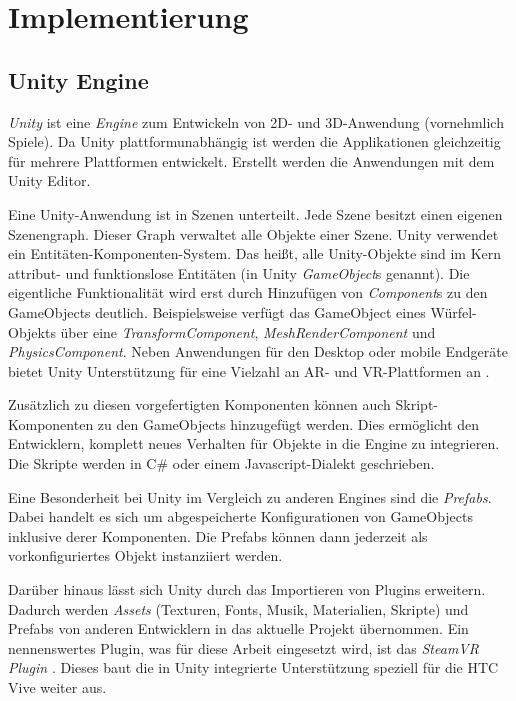 \chapter{Implementierung}
\label{chap:implementation}

\section{Unity Engine}
\emph{Unity} \autocite{UnityTechnologies2018} ist eine \emph{Engine} zum Entwickeln von 2D- und 3D-Anwendung (vornehmlich Spiele).
Da Unity plattformunabhängig ist werden die Applikationen gleichzeitig für mehrere Plattformen entwickelt.
Erstellt werden die Anwendungen mit dem Unity Editor.

Eine Unity-Anwendung ist in Szenen unterteilt.
Jede Szene besitzt einen eigenen Szenengraph.
Dieser Graph verwaltet alle Objekte einer Szene.
Unity verwendet ein Entitäten-Komponenten-System.
Das heißt, alle Unity-Objekte sind im Kern attribut- und funktionslose Entitäten (in Unity \emph{GameObject}s genannt).
Die eigentliche Funktionalität wird erst durch Hinzufügen von \emph{Component}s zu den GameObjects deutlich.
Beispielsweise verfügt das GameObject eines Würfel-Objekts über eine \emph{TransformComponent}, \emph{MeshRenderComponent} und \emph{PhysicsComponent}.
Neben Anwendungen für den Desktop oder mobile Endgeräte bietet Unity Unterstützung für eine Vielzahl an AR- und VR-Plattformen an \parencite{UnityTechnologies2018b}.

Zusätzlich zu diesen vorgefertigten Komponenten können auch Skript-Komponenten zu den GameObjects hinzugefügt werden.
Dies ermöglicht den Entwicklern, komplett neues Verhalten für Objekte in die Engine zu integrieren.
Die Skripte werden in C\# oder einem Javascript-Dialekt geschrieben.

Eine Besonderheit bei Unity im Vergleich zu anderen Engines sind die \emph{Prefabs}.
Dabei handelt es sich um abgespeicherte Konfigurationen von GameObjects inklusive derer Komponenten.
Die Prefabs können dann jederzeit als vorkonfiguriertes Objekt instanziiert werden.

Darüber hinaus lässt sich Unity durch das Importieren von Plugins erweitern.
Dadurch werden \emph{Assets} (Texturen, Fonts, Musik, Materialien, Skripte) und Prefabs von anderen Entwicklern in das aktuelle Projekt übernommen.
Ein nennenswertes Plugin, was für diese Arbeit eingesetzt wird, ist das \emph{SteamVR Plugin} \autocite{ValveCorporation2018}.
Dieses baut die in Unity integrierte Unterstützung speziell für die HTC Vive weiter aus.

